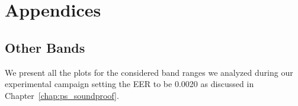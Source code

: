 \appendix
\makeatletter
\renewcommand{\thesection}{\thechapter\@Alph\c@section}
\renewcommand{\thefigure}{\thesection.\arabic{figure}}
\renewcommand{\thetable}{\thesection.\arabic{table}}  
\makeatother

\chapter{Appendices}

\section{Other Bands}
\label{app:ps_sp_otherbands}

We present all the plots for the considered band ranges we analyzed during our experimental campaign setting the EER to be 0.0020 as discussed in Chapter~\ref{chap:ps_soundproof}.


